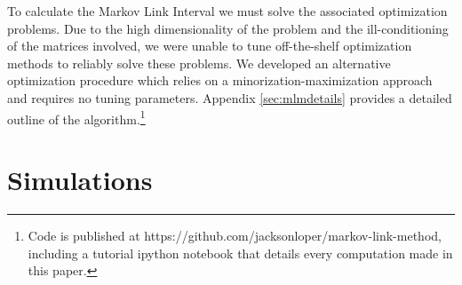 \documentclass{article}
\theoremstyle{definition}
\begin{document}
To calculate the Markov Link Interval we must solve the associated optimization problems.  Due to the high dimensionality of the problem and the ill-conditioning of the matrices involved, we were unable to tune off-the-shelf optimization methods to reliably solve these problems.  We developed an alternative optimization procedure which relies on a minorization-maximization approach and requires no tuning parameters.  Appendix \ref{sec:mlmdetails} provides a detailed outline of the algorithm.\footnote{Code is published at https://github.com/jacksonloper/markov-link-method, including a tutorial ipython notebook that details every computation made in this paper.}  

                                                     
\section{Simulations}
\end{document}
